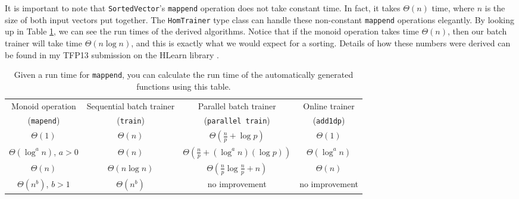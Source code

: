 \documentclass[tikz]{tmr}
\newcommand\h{\lstinline}
\newcommand\+{\mdoubleplus}
\begin{document}
It is important to note that \h{SortedVector}'s \h{mappend} operation does not take constant time.
In fact, it takes $\Theta(n)$ time, where $n$ is the size of both input vectors put together.
The \h{HomTrainer} type class can handle these non-constant \h{mappend} operations elegantly.
By looking up in Table \ref{table:rt}, we can see the run times of the derived algorithms.
Notice that if the monoid operation takes time $\Theta(n)$, then our batch trainer will take time $\Theta(n\log n)$, and this is exactly what we would expect for a sorting.
Details of how these numbers were derived can be found in my TFP13 submission on the HLearn library \cite{me_tfp13}.

\begin{table}[H]
\caption{Given a run time for \h{mappend}, you can calculate the run time of the automatically generated functions using this table.}
\label{table:rt}
\hspace{-0.3in}
\begin{tabular}{ c | c | c | c}
\hline
Monoid operation & Sequential batch trainer & \ \ Parallel batch trainer\ \ & Online trainer\\
\mbox{(\h{mapend})} & \mbox{(\h{train})} & \mbox{(\h{parallel train})} & \mbox{(\h{add1dp})}\\
\hline \hline
$\Theta(1)$ & $\Theta(n)$ & $\Theta\left(\frac{n}{p}+\log p\right)$ & $\Theta(1)$ \\
$\Theta(\log^a n)$, $a>0$ & $\Theta(n)$ & $\Theta\left(\frac{n}{p}+(\log^a n)(\log p)\right)$ & $\Theta(\log^a n)$ \\
$\Theta(n)$ & $\Theta(n\log n)$ & $\Theta\left(\frac{n}{p}\log\frac{n}{p}+n\right)$ & $\Theta(n)$ \\
$\Theta(n^b)$, $b>1$ & $\Theta(n^b)$ & no improvement & no improvement\\
\hline
\end{tabular}
\end{table}
\end{document}
